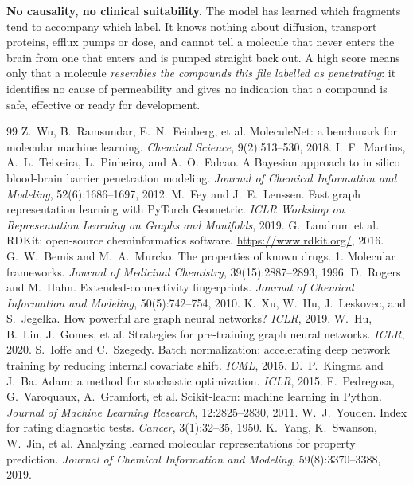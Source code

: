 \documentclass[10pt]{article}
\begin{document}
\textbf{No causality, no clinical suitability.} The model has learned which fragments tend to accompany which
label. It knows nothing about diffusion, transport proteins, efflux pumps or dose, and cannot tell a molecule that
never enters the brain from one that enters and is pumped straight back out. A high score means only that a molecule
\emph{resembles the compounds this file labelled as penetrating}: it identifies no cause of permeability and gives
no indication that a compound is safe, effective or ready for development.

\clearpage
\begin{thebibliography}{99}
\footnotesize
{} Z.~Wu, B.~Ramsundar, E.~N.~Feinberg, et al. MoleculeNet: a benchmark for molecular machine learning. \emph{Chemical Science}, 9(2):513--530, 2018.
 I.~F.~Martins, A.~L.~Teixeira, L.~Pinheiro, and A.~O.~Falcao. A Bayesian approach to in silico blood-brain barrier penetration modeling. \emph{Journal of Chemical Information and Modeling}, 52(6):1686--1697, 2012.
 M.~Fey and J.~E.~Lenssen. Fast graph representation learning with PyTorch Geometric. \emph{ICLR Workshop on Representation Learning on Graphs and Manifolds}, 2019.
 G.~Landrum et al. RDKit: open-source cheminformatics software. \url{https://www.rdkit.org/}, 2016.
 G.~W.~Bemis and M.~A.~Murcko. The properties of known drugs. 1. Molecular frameworks. \emph{Journal of Medicinal Chemistry}, 39(15):2887--2893, 1996.
 D.~Rogers and M.~Hahn. Extended-connectivity fingerprints. \emph{Journal of Chemical Information and Modeling}, 50(5):742--754, 2010.
 K.~Xu, W.~Hu, J.~Leskovec, and S.~Jegelka. How powerful are graph neural networks? \emph{ICLR}, 2019.
 W.~Hu, B.~Liu, J.~Gomes, et al. Strategies for pre-training graph neural networks. \emph{ICLR}, 2020.
 S.~Ioffe and C.~Szegedy. Batch normalization: accelerating deep network training by reducing internal covariate shift. \emph{ICML}, 2015.
 D.~P.~Kingma and J.~Ba. Adam: a method for stochastic optimization. \emph{ICLR}, 2015.
 F.~Pedregosa, G.~Varoquaux, A.~Gramfort, et al. Scikit-learn: machine learning in Python. \emph{Journal of Machine Learning Research}, 12:2825--2830, 2011.
 W.~J.~Youden. Index for rating diagnostic tests. \emph{Cancer}, 3(1):32--35, 1950.
 K.~Yang, K.~Swanson, W.~Jin, et al. Analyzing learned molecular representations for property prediction. \emph{Journal of Chemical Information and Modeling}, 59(8):3370--3388, 2019.
\end{thebibliography}
\end{document}
